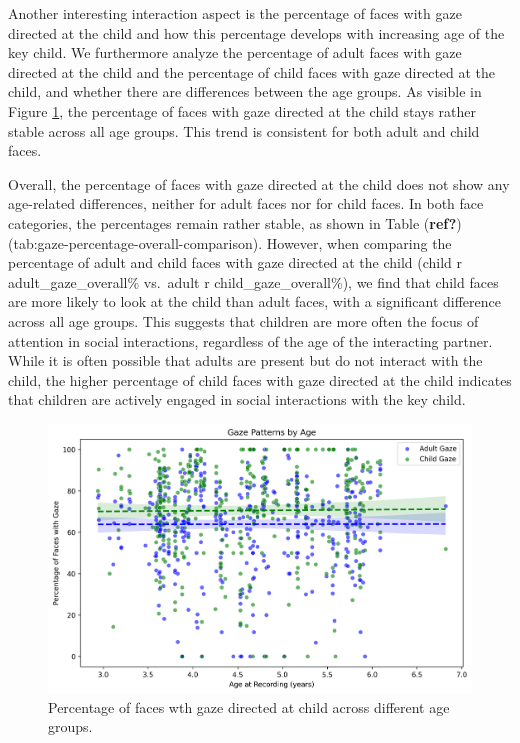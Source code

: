 \documentclass[
  man,floatsintext]{apa6}
\begin{document}
Another interesting interaction aspect is the percentage of faces with gaze directed at the child and how this percentage develops with increasing age of the key child. We furthermore analyze the percentage of adult faces with gaze directed at the child and the percentage of child faces with gaze directed at the child, and whether there are differences between the age groups. As visible in Figure \ref{fig:gaze-patterns}, the percentage of faces with gaze directed at the child stays rather stable across all age groups. This trend is consistent for both adult and child faces.

Overall, the percentage of faces with gaze directed at the child does not show any age-related differences, neither for adult faces nor for child faces. In both face categories, the percentages remain rather stable, as shown in Table (\textbf{ref?})(tab:gaze-percentage-overall-comparison). However, when comparing the percentage of adult and child faces with gaze directed at the child (child r adult\_gaze\_overall\% vs.~adult r child\_gaze\_overall\%), we find that child faces are more likely to look at the child than adult faces, with a significant difference across all age groups. This suggests that children are more often the focus of attention in social interactions, regardless of the age of the interacting partner. While it is often possible that adults are present but do not interact with the child, the higher percentage of child faces with gaze directed at the child indicates that children are actively engaged in social interactions with the key child.

\begin{figure}

{\centering \includegraphics[width=450px]{images/gaze_patterns_by_age} 

}

\caption{Percentage of faces wth gaze directed at child across different age groups.}\label{fig:gaze-patterns}
\end{figure}
\end{document}
